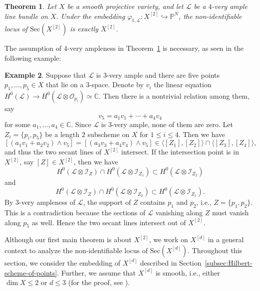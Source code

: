 \documentclass[a4paper]{amsart}
\numberwithin{equation}{section}
\theoremstyle{plain}
\newtheorem{thm}{Theorem}[section]
\theoremstyle{definition}
\newtheorem{exa}[thm]{Example}
\theoremstyle{remark}
\numberwithin{figure}{section}
\numberwithin{table}{section}
\numberwithin{equation}{section}
\def \CC {\mathbb{C}}
\def \PP {\mathbb{P}}
\def \Ical {\mathcal{I}}
\def \Lcal {\mathcal{L}}
\def \Ocal {\mathcal{O}}
\begin{document}
\begin{thm} \label{thm:identifiable-locus-for-Hilbert-scheme-of-points}
    Let $X$ be a smooth projective variety, and let $\Lcal$ be a $4$-very ample line bundle on $X$.
    Under the embedding $\varphi_{1, \Lcal}:X^{[2]} \hookrightarrow \PP^N$, the non-identifiable locus of $\mathrm{Sec} (X^{[2]})$ is exactly $X^{[2]}$.
\end{thm}

The assumption of $4$-very ampleness in Theorem~\ref{thm:identifiable-locus-for-Hilbert-scheme-of-points} is necessary, as seen in the following example:

\begin{exa} \label{exa:higher-very-ampleness-is-necessary}
    Suppose that $\Lcal$ is $3$-very ample and there are five points $p_1, \dots, p_5 \in X$ that lie on a $3$-space.
    Denote by $v_i$ the linear equation $H^0(\Lcal) \rightarrow H^0(\Lcal \otimes \Ocal_{p_i}) \simeq \CC$.
    Then there is a nontrivial relation among them, say
     \[
      v_5 = a_1v_1 + \cdots + a_4v_4
     \]
    for some $a_1, \dots, a_4 \in \CC$.
    Since $\Lcal$ is $3$-very ample, none of them are zero.
    Let $Z_i = \{ p_i, p_5 \}$ be a length $2$ subscheme on $X$ for $1 \leq i \leq 4$.
    Then we have
     \[
      [(a_1v_1 + a_2v_2) \wedge v_5] = [(a_3v_3+a_4v_4) \wedge v_5] \in \langle [Z_1], [Z_2] \rangle \cap \langle [Z_3], [Z_4] \rangle,
     \]
    and thus the two secant lines of $X^{[2]}$ intersect.
    If the intersection point is in $X^{[2]}$, say $[Z] \in X^{[2]}$, then we have
     \[
      H^0(\Lcal \otimes \Ical_Z) \cap H^0(\Lcal \otimes \Ical_{Z_1}) \subset H^0(\Lcal \otimes \Ical_{Z_2})
     \]
    and
     \[
      H^0(\Lcal \otimes \Ical_Z) \cap H^0(\Lcal \otimes \Ical_{Z_2}) \subset H^0(\Lcal \otimes \Ical_{Z_1}).
     \]
    By $3$-very ampleness of $\Lcal$, the support of $Z$ contains $p_1$ and $p_2$, i.e., $Z = \{ p_1,p_2 \}$.
    This is a contradiction because the sections of $\Lcal$ vanishing along $Z$ must vanish along $p_5$ as well.
    Hence the two secant lines intersect out of $X^{[2]}$.
\end{exa}

Although our first main theorem is about $X^{[2]}$, we work on $X^{[d]}$ in a general context to analyze the non-identifiable locus of $\mathrm{Sec}(X^{[d]})$.
Throughout this section, we consider the embedding of $X^{[d]}$ described in Section~\ref{subsec:Hilbert-scheme-of-points}.
Further, we assume that $X^{[d]}$ is smooth, i.e., either $\dim X \leq 2$ or $d \leq 3$ (for the proof, see \cite{Lehn2004}).
\end{document}
